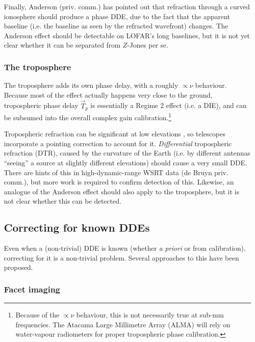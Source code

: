 \documentclass{aa}
\newcommand{\jones}[2]{\vec {#1}_{#2}}
\begin{document}
Finally, Anderson (priv. comm.) has pointed out that refraction through a curved ionosphere should produce a phase DDE, due to the fact that the apparent baseline (i.e. the baseline as seen by the refracted wavefront) changes. The Anderson effect should be detectable on LOFAR's long baselines, but it is not yet clear whether it can be separated from $Z$-Jones per se.
 
\subsubsection{The troposphere\label{sec:troposphere}}

The troposphere adds its own phase delay, with a roughly $\propto\nu$ behaviour. Because most of the effect actually happens very close to the ground, tropospheric phase delay $\jones{T}{p}$ is essentially a Regime 2 effect (i.e. a DIE), and can be subsumed into the overall complex gain calibration.\footnote{Because of the $\propto\nu$ behaviour, this is not necessarily true at sub-mm frequencies. The Atacama Large Millimetre Array (ALMA) will rely on water-vapour radiometers for proper tropospheric phase calibration.}

Tropospheric refraction can be significant at low elevations \citep[Sect~10.1]{tms}, so telescopes incorporate a pointing correction to account for it. \emph{Differential} tropospheric refraction (DTR), caused by the curvature of the Earth (i.e. by different antennas ``seeing'' a source at slightly different elevations) should cause a very small DDE. There are hints of this in high-dynamic-range WSRT data (de Bruyn priv. comm.), but more work is required to confirm detection of this. Likewise, an analogue of the Anderson effect should also apply to the troposphere, but it is not clear whether this can be detected.

\subsection{Correcting for known DDEs\label{sec:dde-correction}}

Even when a (non-trivial) DDE is known (whether \emph{a priori} or from calibration), correcting for it is a non-trivial problem. Several approaches to this have been proposed.

\subsubsection{Facet imaging}
\end{document}
